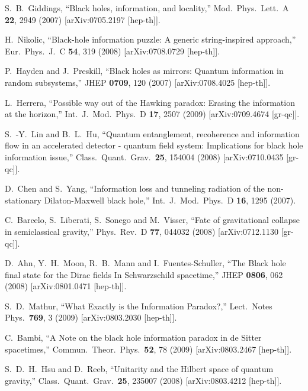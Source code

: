 \documentclass[12pt]{article}
\begin{document}
\begin{thebibliography}{99}
  S.~B.~Giddings,
  ``Black holes, information, and locality,''
  Mod.\ Phys.\ Lett.\ A {\bf 22}, 2949 (2007)
  [arXiv:0705.2197 [hep-th]].

  H.~Nikolic,
  ``Black-hole information puzzle: A generic string-inspired approach,''
  Eur.\ Phys.\ J.\ C {\bf 54}, 319 (2008)
  [arXiv:0708.0729 [hep-th]].

  P.~Hayden and J.~Preskill,
  ``Black holes as mirrors: Quantum information in random subsystems,''
  JHEP {\bf 0709}, 120 (2007)
  [arXiv:0708.4025 [hep-th]].

  L.~Herrera,
  ``Possible way out of the Hawking paradox: Erasing the information at the horizon,''
  Int.\ J.\ Mod.\ Phys.\ D {\bf 17}, 2507 (2009)
  [arXiv:0709.4674 [gr-qc]].

  S.~-Y.~Lin and B.~L.~Hu,
  ``Quantum entanglement, recoherence and information flow in an accelerated detector - quantum field system: Implications for black hole information issue,''
  Class.\ Quant.\ Grav.\  {\bf 25}, 154004 (2008)
  [arXiv:0710.0435 [gr-qc]].

  D.~Chen and S.~Yang,
  ``Information loss and tunneling radiation of the non-stationary Dilaton-Maxwell black hole,''
  Int.\ J.\ Mod.\ Phys.\ D {\bf 16}, 1295 (2007).

  C.~Barcelo, S.~Liberati, S.~Sonego and M.~Visser,
  ``Fate of gravitational collapse in semiclassical gravity,''
  Phys.\ Rev.\ D {\bf 77}, 044032 (2008)
  [arXiv:0712.1130 [gr-qc]].

  D.~Ahn, Y.~H.~Moon, R.~B.~Mann and I.~Fuentes-Schuller,
  ``The Black hole final state for the Dirac fields In Schwarzschild spacetime,''
  JHEP {\bf 0806}, 062 (2008)
  [arXiv:0801.0471 [hep-th]].

  S.~D.~Mathur,
  ``What Exactly is the Information Paradox?,''
  Lect.\ Notes Phys.\  {\bf 769}, 3 (2009)
  [arXiv:0803.2030 [hep-th]].

  C.~Bambi,
  ``A Note on the black hole information paradox in de Sitter spacetimes,''
  Commun.\ Theor.\ Phys.\  {\bf 52}, 78 (2009)
  [arXiv:0803.2467 [hep-th]].

  S.~D.~H.~Hsu and D.~Reeb,
  ``Unitarity and the Hilbert space of quantum gravity,''
  Class.\ Quant.\ Grav.\  {\bf 25}, 235007 (2008)
  [arXiv:0803.4212 [hep-th]].


\end{thebibliography}
\end{document}
